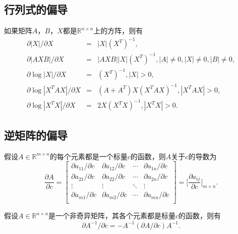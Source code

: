 \subsection{行列式的偏导}
如果矩阵$A$，$B$，$X$都是$\mathbb R^{n\times n}$上的方阵，则有
\begin{eqnarray}
  \partial |X|/\partial X &=& |X| (X^T)^{-1}, \\
  \partial |AXB|/\partial X &=& |AXB||X|(X^T)^{-1}, |A|\ne 0, |X| \ne 0, |B|\ne 0,\\
  \partial \log |X|/\partial X &=& (X^T)^{-1}, |X|>0,\\
  \partial \log |X^T AX|/\partial X &=& (A+A^T) X (X^T A X)^{-1}, |X^T AX|>0,\\
  \partial \log |X^T X|/\partial X &=& 2 X (X^T X)^{-1}, |X^T X|>0.
\end{eqnarray}

\subsection{逆矩阵的偏导}
\begin{definition}
假设$A\in \mathbb R^{m\times n}$的每个元素都是一个标量$c$的函数，则$A$关于$c$的导数为
\begin{equation}
    \frac{\partial A}{\partial c} =
    \begin{bmatrix}
        \partial a_{11}/\partial c & \partial a_{12}/\partial c & \cdots & \partial a_{1n}/\partial c\\
        \partial a_{21}/\partial c & \partial a_{22}/\partial c & \cdots & \partial a_{2n}/\partial c\\
        \vdots & \vdots & \ddots & \vdots\\
        \partial a_{m1}/\partial c & \partial a_{m2}/\partial c & \cdots & \partial a_{mn}/\partial c\\
    \end{bmatrix} = \Bigg[\frac{\partial a_{ij}}{\partial c}\Bigg]_{m\times n}.
\end{equation}
\end{definition}

\begin{proposition}
假设$A\in \mathbb R^{n\times n}$是一个非奇异矩阵，其各个元素都是标量$c$的函数，则有
\begin{equation}
    \partial A^{-1}/\partial c = -A^{-1} (\partial A/\partial c) A^{-1}.
\end{equation}
\end{proposition}

